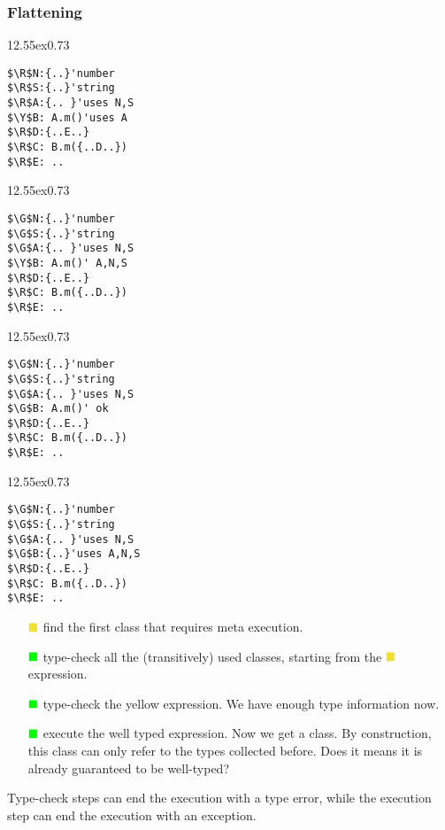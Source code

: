 \newcommand\mini{\begin{NiceCode}{12.55ex}{0.73}}
\newcommand\G{\color{green}{\blacksquare}}
\newcommand\R{\color{red}{\blacksquare}}
\newcommand\Y{\color{darkYellow}{\blacksquare}}
\newcommand\GG{\color{black}{\blacksquare}}
\begin{frame}[fragile]
\frametitle{Flattening}
\mini
\begin{lstlisting}
$\R$N:{..}'number
$\R$S:{..}'string
$\R$A:{.. }'uses N,S
$\Y$B: A.m()'uses A
$\R$D:{..E..}
$\R$C: B.m({..D..})
$\R$E: ..
\end{lstlisting}
\end{NiceCode}
\mini
\begin{lstlisting}
$\G$N:{..}'number
$\G$S:{..}'string
$\G$A:{.. }'uses N,S
$\Y$B: A.m()' A,N,S
$\R$D:{..E..}
$\R$C: B.m({..D..})
$\R$E: ..
\end{lstlisting}
\end{NiceCode}
\mini
\begin{lstlisting}
$\G$N:{..}'number
$\G$S:{..}'string
$\G$A:{.. }'uses N,S
$\G$B: A.m()' ok
$\R$D:{..E..}
$\R$C: B.m({..D..})
$\R$E: ..
\end{lstlisting}
\end{NiceCode}
\mini
\begin{lstlisting}
$\G$N:{..}'number
$\G$S:{..}'string
$\G$A:{.. }'uses N,S
$\G$B:{..}'uses A,N,S
$\R$D:{..E..}
$\R$C: B.m({..D..})
$\R$E: ..
\end{lstlisting}
\end{NiceCode}
\small
\begin{itemize}
\item[$\Y$]
find the first class that requires meta execution.
\item[$\G$]
type-check all the (transitively) used classes, starting from the $\Y$ expression.
\item[$\G$]
type-check the yellow expression. We have enough type information now.
\item[$\G$]
execute the well typed expression. Now we get a class.
By construction, this class can only refer to the types collected before.
Does it means it is already guaranteed to be well-typed?
\end{itemize}
Type-check steps can end the execution with a type error,
while the execution step can end the execution with an exception.

\end{frame}




